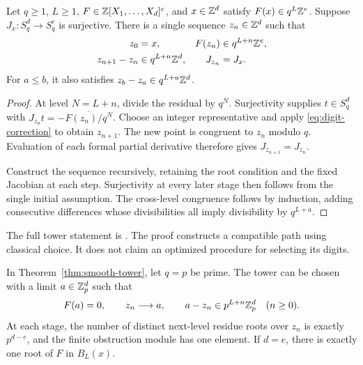 \begin{theorem}\label{thm:smooth-tower}
Let $q\ge1$, $L\ge1$, $F\in\mathbb Z[X_1,\ldots,X_d]^e$, and
$x\in\mathbb Z^d$ satisfy $F(x)\in q^L\mathbb Z^e$. Suppose $J_x:S_q^d\to S_q^e$
is surjective. There is a single sequence $z_n\in\mathbb Z^d$ such that
\begin{align*}
 z_0&=x,& F(z_n)&\in q^{L+n}\mathbb Z^e,\\
 z_{n+1}-z_n&\in q^{L+n}\mathbb Z^d,& J_{z_n}&=J_x.
\end{align*}
For $a\le b$, it also satisfies $z_b-z_a\in q^{L+a}\mathbb Z^d$.
\end{theorem}

\begin{proof}
At level $N=L+n$, divide the residual by $q^N$. Surjectivity supplies
$t\in S_q^d$ with $J_{z_n}t=-\overline{F(z_n)/q^N}$. Choose an integer
representative and apply \eqref{eq:digit-correction} to obtain $z_{n+1}$.
The new point is congruent to $z_n$ modulo $q$. Evaluation of each formal
partial derivative therefore gives $J_{z_{n+1}}=J_{z_n}$.

Construct the sequence recursively, retaining the root condition and the
fixed Jacobian at each step. Surjectivity at every later stage then follows
from the single initial assumption. The cross-level congruence follows by
induction, adding consecutive differences whose divisibilities all imply divisibility
by $q^{L+a}$.
\end{proof}

The full tower statement is
.
The proof constructs a compatible path using classical choice. It does not
claim an optimized procedure for selecting its digits.

\begin{theorem}\label{thm:smooth-padic-root}
In Theorem~\ref{thm:smooth-tower}, let $q=p$ be prime. The tower can be
chosen with a limit $a\in\mathbb Z_p^d$ such that
\[
 F(a)=0,\qquad z_n\longrightarrow a,\qquad
 a-z_n\in p^{L+n}\mathbb Z_p^d\quad(n\ge0).
\]
At each stage, the number of distinct next-level residue roots over $z_n$
is exactly $p^{d-e}$, and the finite obstruction module has one element.
If $d=e$, there is exactly one root of $F$ in $B_L(x)$.
\end{theorem}

